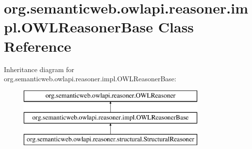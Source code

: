 \hypertarget{classorg_1_1semanticweb_1_1owlapi_1_1reasoner_1_1impl_1_1_o_w_l_reasoner_base}{\section{org.\-semanticweb.\-owlapi.\-reasoner.\-impl.\-O\-W\-L\-Reasoner\-Base Class Reference}
\label{classorg_1_1semanticweb_1_1owlapi_1_1reasoner_1_1impl_1_1_o_w_l_reasoner_base}
}
Inheritance diagram for org.\-semanticweb.\-owlapi.\-reasoner.\-impl.\-O\-W\-L\-Reasoner\-Base\-:\begin{figure}[H]
\begin{center}
\leavevmode
\includegraphics[height=3.000000cm]{classorg_1_1semanticweb_1_1owlapi_1_1reasoner_1_1impl_1_1_o_w_l_reasoner_base}
\end{center}
\end{figure}
